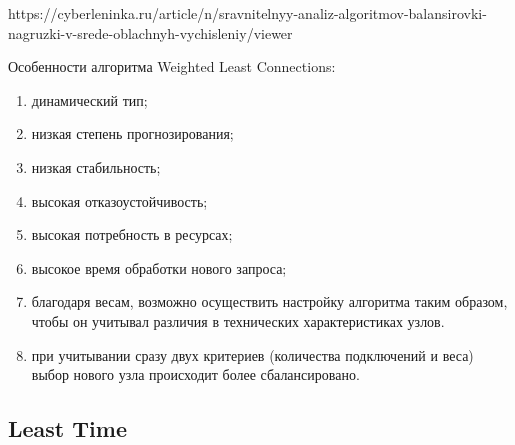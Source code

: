 https://cyberleninka.ru/article/n/sravnitelnyy-analiz-algoritmov-balansirovki-nagruzki-v-srede-oblachnyh-vychisleniy/viewer

Особенности алгоритма Weighted Least Connections:
\begin{enumerate}[label=---]
	\item динамический тип;
	\item низкая степень прогнозирования; 
	\item низкая стабильность;
	\item высокая отказоустойчивость;
	\item высокая потребность в ресурсах;
	\item высокое время обработки нового запроса;
	\item благодаря весам, возможно осуществить настройку алгоритма таким образом, чтобы он учитывал различия в технических характеристиках узлов.
	\item при учитывании сразу двух критериев (количества подключений и веса) выбор нового узла происходит более сбалансировано.
\end{enumerate}


\subsection{Least Time}
